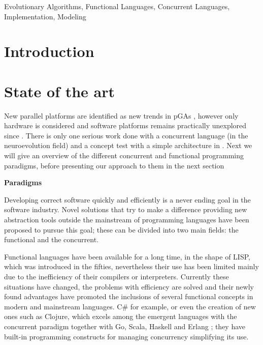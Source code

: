 \documentclass[a4paper]{llncs}
\newcommand{\keywords}[1]{\par\addvspace\baselineskip
\noindent\keywordname\enspace\ignorespaces#1}
\newcommand{\simpleEntry}[1]
{
\vspace{.3cm}
\noindent \textbf{#1}
\vspace{.3cm}
}
\begin{document}

\keywords{Evolutionary Algorithms, Functional Languages, Concurrent Languages, Implementation, Modeling}


\section{Introduction}
\label{sec:intro}
    

\section{State of the art}
\label{sec:stateArt}

New parallel platforms are identified as new trends in
pGAs \cite{Luque2011}, however only hardware is considered and software
platforms remains practically unexplored since
\cite{Santos2002}. There is only one serious work \cite{Sher2013} done
with a concurrent language (in the neuroevolution field) and a concept
test with a simple architecture in \cite{AmandaBienz2011}.  Next we
will give an overview of the different concurrent and functional
programming paradigms, before presenting our approach to them in the
next section

\simpleEntry{Paradigms}
\label{sec:paradigmas}

Developing correct software quickly and efficiently is a never ending
goal in the software industry. Novel solutions that try to make a
difference providing new abstraction tools outside the mainstream of
programming languages have been proposed to pursue this goal; these
can be divided into two main fields: the functional and the
concurrent. 

Functional languages have been available for a long time, in the shape
of LISP, which was introduced in the fifties, nevertheless their use
has been limited mainly due to the inefficiency of their compilers or
interpreters. Currently these situations have changed, the problems
with efficiency are solved and their newly found advantages have
promoted the inclusions of several functional concepts in modern and
mainstream languages. C\# for example, or even the creation of new
ones such as Clojure, which excels among the emergent languages with
the concurrent paradigm together with Go, Scala, Haskell and Erlang
\cite{DiPierro:2012:CMP}; they have built-in programming constructs
for managing concurrency simplifying its use. 
\end{document}
